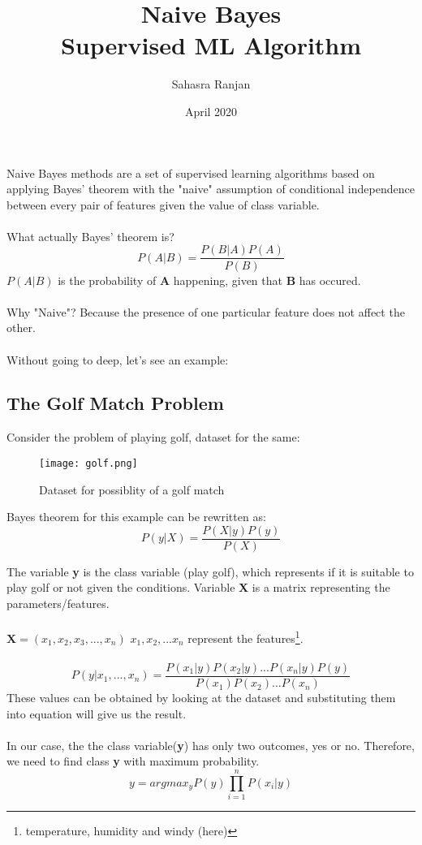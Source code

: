 \documentclass[12pt, A4]{report}
\title{\textbf{Naive Bayes}\\ \large{Supervised ML Algorithm}}
\author{Sahasra Ranjan}
\date{April 2020}
\begin{document}
\begin{titlepage}
\maketitle
\end{titlepage}

Naive Bayes methods are a set of supervised learning algorithms based on applying Bayes' theorem with the "naive" assumption of conditional independence between every pair of features given the value of class variable.\\ \\
What actually Bayes' theorem is?
\begin{equation}\label {eq:bayes}
	P(A|B) = \frac{P(B|A)P(A)}{P(B)}
\end{equation}
$P(A|B)$ is the probability of \textbf{A} happening, given that \textbf{B} has occured.\\ \\ Why "Naive"? Because the presence of one particular feature does not affect the other.
\\ \\ 
Without going to deep, let's see an example:

\subsection*{The Golf Match Problem}
	Consider the problem of playing golf, dataset for the same:
	\begin{figure}[h]
		\centering
		\texttt{[image: golf.png]}
		\caption{Dataset for possiblity of a golf match}
	\end{figure}

	Bayes theorem for this example can be rewritten as:
	\begin{equation}
		P(y|X) = \frac{P(X|y)P(y)}{P(X)}
	\end{equation}

	The variable \textbf{y} is the class variable (play golf), which represents if it is suitable to play golf or not given the conditions. Variable \textbf{X} is a matrix representing the parameters/features.
	\\ \\
	$\textbf{X} = (x_1, x_2, x_3, ... , x_n)$ \hfill	\small{$x_1, x_2, ... x_n$ represent the features}\footnote[1]{temperature, humidity and windy (here)}.
	\\ \\

	\begin{equation}
		P(y|x_1, ..., x_n) = \frac{P(x_1|y)P(x_2|y)...P(x_n|y)P(y)}{P(x_1)P(x_2)...P(x_n)}
	\end{equation}
	These values can be obtained by looking at the dataset and substituting them into equation will give us the result.
	\\ \\
	In our case, the the class variable(\textbf{y}) has only two outcomes, yes or no. Therefore, we need to find class \textbf{y} with maximum probability. 
	\begin{equation}
		y = argmax_yP(y)\prod_{i=1}^{n}P(x_i|y)
	\end{equation}
\end{document}
